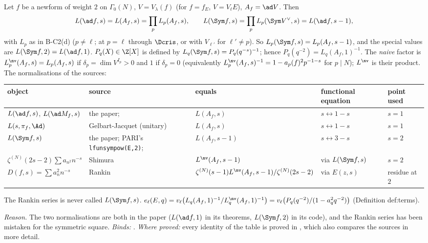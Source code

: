 \begin{convention}\label{conv:notation:bc7}
Let $f$ be a newform of weight $2$ on $\Gamma_0(N)$, $V=V_\lambda(f)$ (for $f=f_E$, $V=V_\ell E$), $A_f=\ad V$. Then
\[
L(\ad f,s)=L(A_f,s)=\prod_pL_p(A_f,s),\qquad L(\Sym f,s)=\prod_pL_p(\Sym V^\vee,s)=L(\ad f,s-1),
\]
with $L_p$ as in B-C2(d) ($p\ne\ell$; at $p=\ell$ through $\Dcris$, or with $V_{\ell'}$ for $\ell'\ne p$). So $L_p(\Sym f,s)=L_p(A_f,s-1)$,
and the special values are $L(\Sym f,2)=L(\ad f,1)$. $P_q(X)\in\Z[X]$ is defined by $L_q(\Sym f,s)=P_q(q^{-s})^{-1}$; hence
$P_q(q^{-2})=L_q(A_f,1)^{-1}$. The \emph{naive} factor is $L_p^{\nv}(A_f,s)=L_p(A_f,s)$ if $\delta_p=\dim V^{I_p}>0$ and $1$ if $\delta_p=0$
(equivalently $L_p^{\nv}(A_f,s)^{-1}=1-a_p(f)^2p^{-1-s}$ for $p\mid N$); $L^{\nv}$ is their product. The normalisations of the sources:
\begin{center}\small
\begin{tabular}{@{}p{3.6cm}p{3.1cm}p{3.6cm}p{2.3cm}p{1.4cm}@{}}
\toprule
object & source & equals & functional equation & point used\\
\midrule
$L(\ad f,s)$, $L(\ad M_f,s)$ & the paper; \cite[1.7.2]{DFG04} & $L(A_f,s)$ & $s\leftrightarrow1-s$ & $s=1$\\
$L(s,\pi_f,\Ad)$ & Gelbart-Jacquet \cite{GelbartJacquet} (unitary) & $L(A_f,s)$ & $s\leftrightarrow1-s$ & $s=1$\\
$L(\Sym f,s)$ & the paper; PARI's \texttt{lfunsympow(E,2)}; \cite{Watkins02} & $L(A_f,s-1)$ & $s\leftrightarrow3-s$ & $s=2$\\
$\zeta^{(N)}(2s-2)\sum a_{n^2}n^{-s}$ & Shimura \cite{Shimura75} & $L^{\nv}(A_f,s-1)$ & via $L(\Sym f,s)$ & $s=2$\\
$D(f,s)=\sum a_n^2n^{-s}$ & Rankin \cite{Rankin39} & $\zeta^{(N)}(s-1)L^{\nv}(A_f,s-1)/\zeta^{(N)}(2s-2)$ & via $E(z,s)$ & residue at $2$\\
\bottomrule
\end{tabular}
\end{center}
The Rankin series is never called $L(\Sym f,s)$. $e_\ell(E,q)=v_\ell\bigl(L_q(A_f,1)^{-1}/L_q^{\nv}(A_f,1)^{-1}\bigr)=v_\ell\bigl(P_q(q^{-2})/(1-a_q^2q^{-2})\bigr)$
(Definition def:terms).
\end{convention}

\noindent\emph{Reason.} The two normalisations are both in the paper ($L(\ad f,1)$ in its theorems, $L(\Sym f,2)$ in its code),
and the Rankin series has been mistaken for the symmetric square. \emph{Binds:}
.
\emph{Where proved:} every identity of the table is proved in , which also compares the sources in more
detail.

